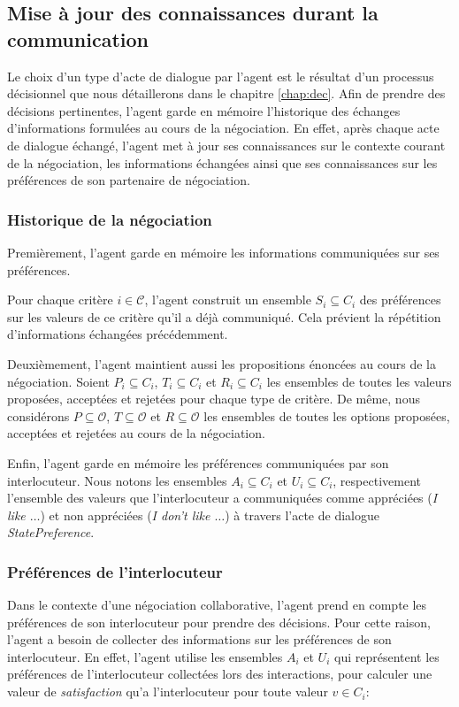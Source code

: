 \subsection{Mise à jour des connaissances durant la communication}

Le choix d'un type d'acte de dialogue par l'agent est le résultat d'un processus décisionnel que nous détaillerons dans le chapitre \ref{chap:dec}. 
Afin de prendre des décisions pertinentes, l'agent garde en mémoire l'historique des échanges d'informations formulées au cours de la négociation.  En effet, après chaque acte de dialogue échangé, l'agent met à jour ses connaissances sur le contexte courant de la négociation, les informations échangées ainsi que ses connaissances sur les préférences de son partenaire de négociation.  

\subsubsection{Historique de la négociation}
Premièrement, l'agent garde en mémoire les informations communiquées sur ses préférences.

Pour chaque critère $i\in\mathcal{C}$, l'agent construit un ensemble $S_i \subseteq C_i$ des préférences sur les valeurs de ce critère qu'il a déjà communiqué. Cela prévient la répétition d'informations échangées précédemment. 

Deuxièmement, l'agent maintient aussi les propositions énoncées au cours de la négociation. Soient $P_i \subseteq C_i$, $T_i\subseteq C_i$ et $R_i\subseteq C_i$ les ensembles de toutes les valeurs proposées, acceptées et rejetées pour chaque type de critère. 
De même, nous considérons $P\subseteq \mathcal{O}$, $T\subseteq \mathcal{O}$ et $R\subseteq \mathcal{O}$ les ensembles de toutes les options proposées, acceptées et rejetées au cours de la négociation.

Enfin, l'agent garde en mémoire les préférences communiquées par son interlocuteur. Nous notons les ensembles $A_i\subseteq C_i$ et $U_i\subseteq C_i$, respectivement l'ensemble des valeurs que l'interlocuteur a communiquées comme appréciées (\textit{I like $\ldots$}) et non appréciées  (\textit{I don't like $\ldots$}) à travers l'acte de dialogue \textit{StatePreference}.

\subsubsection{Préférences de  l'interlocuteur}
Dans le contexte d'une négociation collaborative, l'agent prend en compte les préférences de son interlocuteur pour prendre des décisions. Pour cette raison, l'agent a besoin de collecter des informations sur les préférences de son interlocuteur. En effet, l'agent utilise les ensembles $A_i$ et $U_i$ qui représentent les préférences de l'interlocuteur collectées lors des interactions, pour calculer une valeur de \emph{satisfaction}  qu'a l'interlocuteur pour toute valeur $v\in C_i$:


